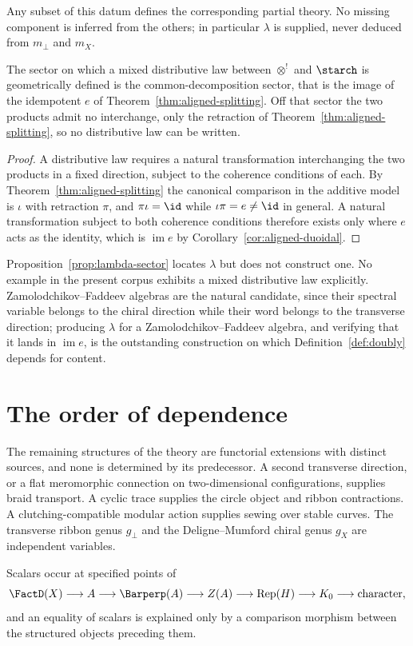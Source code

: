 Any subset of this datum defines the corresponding partial theory. No
missing component is inferred from the others; in particular $\lambda$ is
supplied, never deduced from $m_\perp$ and $m_X$.

\begin{proposition}
\label{prop:lambda-sector}
\StatusProved{} The sector on which a mixed distributive law between
$\otimes^!$ and $\starch$ is geometrically defined is the
common-decomposition sector, that is the image of the idempotent $e$ of
Theorem~\ref{thm:aligned-splitting}. Off that sector the two products
admit no interchange, only the retraction of
Theorem~\ref{thm:aligned-splitting}, so no distributive law can be
written.
\end{proposition}

\begin{proof}
A distributive law requires a natural transformation interchanging the
two products in a fixed direction, subject to the coherence conditions of
each. By Theorem~\ref{thm:aligned-splitting} the canonical comparison in
the additive model is $\iota$ with retraction $\pi$, and $\pi\iota=\id$
while $\iota\pi=e\ne\id$ in general. A natural transformation subject to
both coherence conditions therefore exists only where $e$ acts as the
identity, which is $\operatorname{im}e$ by
Corollary~\ref{cor:aligned-duoidal}.
\end{proof}

\begin{remark}
\label{rem:lambda-open}
Proposition~\ref{prop:lambda-sector} locates $\lambda$ but does not
construct one. No example in the present corpus exhibits a mixed
distributive law explicitly. Zamolodchikov--Faddeev algebras are the
natural candidate, since their spectral variable belongs to the chiral
direction while their word belongs to the transverse direction; producing
$\lambda$ for a Zamolodchikov--Faddeev algebra, and verifying that it
lands in $\operatorname{im}e$, is the outstanding construction on which
Definition~\ref{def:doubly} depends for content.
\end{remark}

\section{The order of dependence}

The remaining structures of the theory are functorial extensions with
distinct sources, and none is determined by its predecessor. A second
transverse direction, or a flat meromorphic connection on
two-dimensional configurations, supplies braid transport. A cyclic trace
supplies the circle object and ribbon contractions. A
clutching-compatible modular action supplies sewing over stable curves.
The transverse ribbon genus $g_\perp$ and the Deligne--Mumford chiral
genus $g_X$ are independent variables.

Scalars occur at specified points of
\[
  \FactD(X) \longrightarrow A \longrightarrow \Barperp(A)
  \longrightarrow Z(A) \longrightarrow \mathrm{Rep}(H)
  \longrightarrow K_0 \longrightarrow \text{character},
\]
and an equality of scalars is explained only by a comparison morphism
between the structured objects preceding them.
